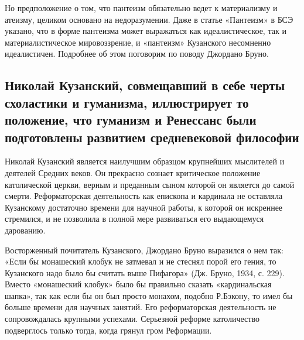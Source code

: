 Но предположение о том, что пантеизм обязательно ведет к материализму
и атеизму, целиком основано на недоразумении. Даже в статье «Пантеизм»
в БСЭ указано, что в форме пантеизма может выражаться как
идеалистическое, так и материалистическое мировоззрение, и «пантеизм»
Кузанского несомненно идеалистичен. Подробнее об этом поговорим по
поводу Джордано Бруно.

\subsection{Николай Кузанский, совмещавший в себе черты схоластики и
гуманизма, иллюстрирует то положение, что гуманизм и Ренессанс были
подготовлены развитием средневековой философии}

Николай Кузанский является наилучшим образцом крупнейших
мыслителей и деятелей Средних веков. Он прекрасно сознает критическое
положение католической церкви, верным и преданным сыном которой он
является до самой смерти. Реформаторская деятельность как епископа и
кардинала не оставляла Кузанскому достаточно времени для научной
работы, к которой он искреннее стремился, и не позволила в полной мере
развиваться его выдающемуся дарованию.

Восторженный почитатель Кузанского, Джордано Бруно выразился о нем
так: «Если бы монашеский клобук не затмевал и не стеснял порой его
гения, то Кузанского надо было бы считать выше Пифагора» (Дж. Бруно,
1934, с. 229). Вместо «монашеский клобук» было бы правильно сказать
«кардинальская шапка», так как если бы он был просто монахом, подобно
Р.Бэкону, то имел бы больше времени для научных занятий. Его
реформаторская деятельность не сопровождалась крупными успехами.
Серьезной реформе католичество подверглось только тогда, когда грянул
гром Реформации.

